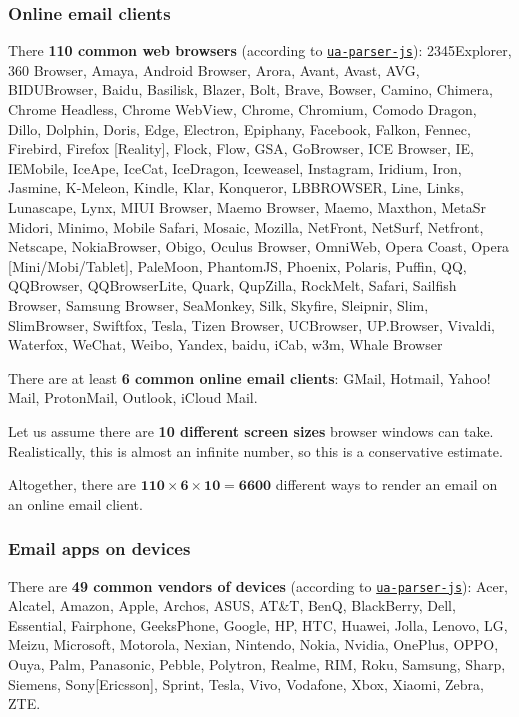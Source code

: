 \documentclass{article}
\begin{document}
\subsubsection{Online email clients}

There \textbf{110 common web browsers} (according to \href{https://www.npmjs.com/package/ua-parser-js}{\texttt{ua-parser-js}}): 2345Explorer, 360 Browser, Amaya, Android Browser, Arora, Avant, Avast, AVG,
BIDUBrowser, Baidu, Basilisk, Blazer, Bolt, Brave, Bowser, Camino, Chimera,
Chrome Headless, Chrome WebView, Chrome, Chromium, Comodo Dragon, Dillo,
Dolphin, Doris, Edge, Electron, Epiphany, Facebook, Falkon, Fennec, Firebird,
Firefox [Reality], Flock, Flow, GSA, GoBrowser, ICE Browser, IE, IEMobile, IceApe, 
IceCat, IceDragon, Iceweasel, Instagram, Iridium, Iron, Jasmine, K-Meleon,
Kindle, Klar, Konqueror, LBBROWSER, Line, Links, Lunascape, Lynx, MIUI Browser,
Maemo Browser, Maemo, Maxthon, MetaSr Midori, Minimo, Mobile Safari, Mosaic,
Mozilla, NetFront, NetSurf, Netfront, Netscape, NokiaBrowser, Obigo, Oculus Browser,
OmniWeb, Opera Coast, Opera [Mini/Mobi/Tablet], PaleMoon, PhantomJS, Phoenix, 
Polaris, Puffin, QQ, QQBrowser, QQBrowserLite, Quark, QupZilla, RockMelt, Safari, 
Sailfish Browser, Samsung Browser, SeaMonkey, Silk, Skyfire, Sleipnir, Slim, 
SlimBrowser, Swiftfox, Tesla, Tizen Browser, UCBrowser, UP.Browser, Vivaldi, 
Waterfox, WeChat, Weibo, Yandex, baidu, iCab, w3m, Whale Browser

There are at least \textbf{6 common online email clients}: GMail, Hotmail, Yahoo! Mail, ProtonMail, Outlook, iCloud Mail.

Let us assume there are \textbf{10 different screen sizes} browser windows can take. Realistically, this is almost an infinite number, so this is a conservative estimate.

Altogether, there are $\mathbf{110 \times 6 \times 10 = 6600}$ different ways to render an email on an online email client.

\subsubsection{Email apps on devices}

There are \textbf{49 common vendors of devices} (according to \href{https://www.npmjs.com/package/ua-parser-js}{\texttt{ua-parser-js}}): Acer, Alcatel, Amazon, Apple, Archos, ASUS, AT\&T, BenQ, BlackBerry, Dell,
Essential, Fairphone, GeeksPhone, Google, HP, HTC, Huawei, Jolla, Lenovo, LG, 
Meizu, Microsoft, Motorola, Nexian, Nintendo, Nokia, Nvidia, OnePlus, OPPO, Ouya,
Palm, Panasonic, Pebble, Polytron, Realme, RIM, Roku, Samsung, Sharp, Siemens,
Sony[Ericsson], Sprint, Tesla, Vivo, Vodafone, Xbox, Xiaomi, Zebra, ZTE.
\end{document}
